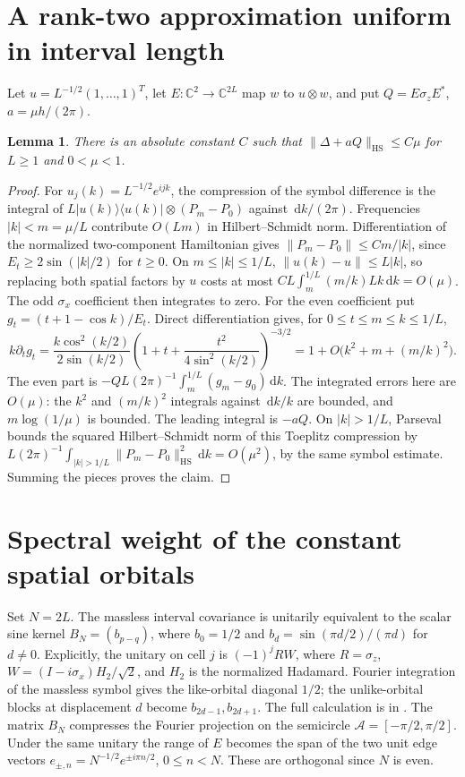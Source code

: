 \documentclass[11pt,letterpaper]{article}
\newtheorem{lemma}[theorem]{Lemma}
\newcommand{\HS}{\mathrm{HS}}
\newcommand{\dd}{\,\mathrm d}
\newcommand{\arc}{\mathcal A}
\begin{document}
\section{A rank-two approximation uniform in interval length}
Let \(u=L^{-1/2}(1,\ldots,1)^T\), let \(E:\mathbb C^2\to\mathbb C^{2L}\) map \(w\) to \(u\otimes w\), and put \(Q=E\sigma_z E^*\), \(a=\mu h/(2\pi)\).
\begin{lemma}\label{lem:tangent}
There is an absolute constant \(C\) such that \(\|\Delta+aQ\|_{\HS}\le C\mu\) for \(L\ge1\) and \(0<\mu<1\).
\end{lemma}
\begin{proof}
For \(u_j(k)=L^{-1/2}e^{ijk}\), the compression of the symbol difference is the integral of \(L|u(k)\rangle\langle u(k)|\otimes(P_m-P_0)\) against \(\dd k/(2\pi)\). Frequencies \(|k|<m=\mu/L\) contribute \(O(Lm)\) in Hilbert--Schmidt norm. Differentiation of the normalized two-component Hamiltonian gives \(\|P_m-P_0\|\le Cm/|k|\), since \(E_t\ge2\sin(|k|/2)\) for \(t\ge0\). On \(m\le |k|\le1/L\), \(\|u(k)-u\|\le L|k|\), so replacing both spatial factors by \(u\) costs at most \(CL\int_m^{1/L}(m/k)Lk\dd k=O(\mu)\). The odd \(\sigma_x\) coefficient then integrates to zero. For the even coefficient put \(g_t=(t+1-\cos k)/E_t\). Direct differentiation gives, for \(0\le t\le m\le k\le1/L\),
\[
 k\partial_t g_t=\frac{k\cos^2(k/2)}{2\sin(k/2)}
 \left(1+t+\frac{t^2}{4\sin^2(k/2)}\right)^{-3/2}
 =1+O\bigl(k^2+m+(m/k)^2\bigr).
\]
The even part is \(-Q L(2\pi)^{-1}\int_m^{1/L}(g_m-g_0)\dd k\).
The integrated errors here are \(O(\mu)\): the \(k^2\) and \((m/k)^2\) integrals against \(\dd k/k\) are bounded, and \(m\log(1/\mu)\) is bounded. The leading integral is \(-aQ\). On \(|k|>1/L\), Parseval bounds the squared Hilbert--Schmidt norm of this Toeplitz compression by \(L(2\pi)^{-1}\int_{|k|>1/L}\|P_m-P_0\|_{\HS}^2\dd k=O(\mu^2)\), by the same symbol estimate. Summing the pieces proves the claim.
\end{proof}

\section{Spectral weight of the constant spatial orbitals}
Set \(N=2L\). The massless interval covariance is unitarily equivalent to the scalar sine kernel \(B_N=(b_{p-q})\), where \(b_0=1/2\) and \(b_d=\sin(\pi d/2)/(\pi d)\) for \(d\ne0\). Explicitly, the unitary on cell \(j\) is \((-1)^j RW\), where \(R=\sigma_z\), \(W=(I-i\sigma_x)H_2/\sqrt2\), and \(H_2\) is the normalized Hadamard. Fourier integration of the massless symbol gives the like-orbital diagonal \(1/2\); the unlike-orbital blocks at displacement \(d\) become \(b_{2d-1},b_{2d+1}\). The full calculation is in \cite[part 3, Theorem 1, pp.~17--18]{d8}. The matrix \(B_N\) compresses the Fourier projection on the semicircle \(\arc=[-\pi/2,\pi/2]\). Under the same unitary the range of \(E\) becomes the span of the two unit edge vectors \(e_{\pm,n}=N^{-1/2}e^{\pm i\pi n/2}\), \(0\le n<N\). These are orthogonal since \(N\) is even.
\end{document}
